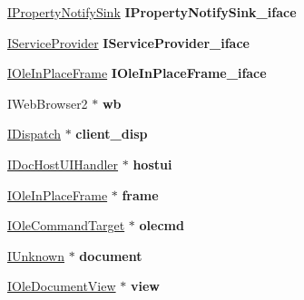 \begin{DoxyCompactItemize}
\hyperlink{interface_i_property_notify_sink}{I\+Property\+Notify\+Sink} {\bfseries I\+Property\+Notify\+Sink\+\_\+iface}
\item 
\mbox{\label{struct_doc_host_a97db3d08e0c4f52745abf9d3940f6d69}} 
\hyperlink{interface_i_service_provider}{I\+Service\+Provider} {\bfseries I\+Service\+Provider\+\_\+iface}
\item 
\mbox{\label{struct_doc_host_a575ed7e7c9b68ed17bb367018431c435}} 
\hyperlink{interface_i_ole_in_place_frame}{I\+Ole\+In\+Place\+Frame} {\bfseries I\+Ole\+In\+Place\+Frame\+\_\+iface}
\item 
\mbox{\label{struct_doc_host_a513f446051a9d37558d401c30cb19398}} 
I\+Web\+Browser2 $\ast$ {\bfseries wb}
\item 
\mbox{\label{struct_doc_host_ae41253f8a941116fe4f739231b1d87c7}} 
\hyperlink{interface_i_dispatch}{I\+Dispatch} $\ast$ {\bfseries client\+\_\+disp}
\item 
\mbox{\label{struct_doc_host_a8348b316a619bac43d4bd65ecb668d53}} 
\hyperlink{interface_i_doc_host_u_i_handler}{I\+Doc\+Host\+U\+I\+Handler} $\ast$ {\bfseries hostui}
\item 
\mbox{\label{struct_doc_host_a9ce4896665af5906b72db3a1da0e6525}} 
\hyperlink{interface_i_ole_in_place_frame}{I\+Ole\+In\+Place\+Frame} $\ast$ {\bfseries frame}
\item 
\mbox{\label{struct_doc_host_a899729b1b973052cf025d0bf999f70d9}} 
\hyperlink{interface_i_ole_command_target}{I\+Ole\+Command\+Target} $\ast$ {\bfseries olecmd}
\item 
\mbox{\label{struct_doc_host_a7eafaa13cf9e415248a666cddf1f0196}} 
\hyperlink{interface_i_unknown}{I\+Unknown} $\ast$ {\bfseries document}
\item 
\mbox{\label{struct_doc_host_ada8ed53ba75373db8e4bfcb0370571b8}} 
\hyperlink{interface_i_ole_document_view}{I\+Ole\+Document\+View} $\ast$ {\bfseries view}
\item 
\mbox{\label{struct_doc_host_a4d5e06fd6bed63e8b989e9a82585919c}} 

\end{DoxyCompactItemize}
